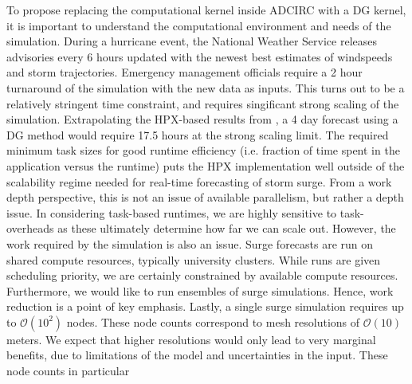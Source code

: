 To propose replacing the computational kernel inside ADCIRC with a DG kernel, it is important to understand the computational environment and needs of the simulation. During a hurricane event, the National Weather Service releases advisories every 6 hours updated with the newest best estimates of windspeeds and storm trajectories. Emergency management officials require a 2 hour turnaround of the simulation with the new data as inputs. This turns out to be a relatively stringent time constraint, and requires singificant strong scaling of the simulation. Extrapolating the HPX-based results from \cite{Bremer2019}, a 4 day forecast using a DG method would require 17.5 hours at the strong scaling limit.  The required minimum task sizes for good runtime efficiency (i.e. fraction of time spent in the application versus the runtime) puts the HPX implementation well outside of the scalability regime needed for real-time forecasting of storm surge. 
From a work depth perspective, this is not an issue of available parallelism, but rather a depth issue. In considering task-based runtimes, we are highly sensitive to task-overheads as these ultimately determine how far we can scale out.
 However, the work required by the simulation is also an issue. Surge forecasts are run on shared compute resources, typically university clusters. While runs are given scheduling priority, we are certainly constrained by available compute resources. Furthermore, we would like to run ensembles of surge simulations. Hence, work reduction is a point of key emphasis.
 Lastly, a single surge simulation requires up to $\mathcal{O}(10^2)$ nodes. These node counts correspond to mesh resolutions of $\mathcal{O}(10)$ meters. We expect that higher resolutions would only lead to very marginal benefits, due to limitations of the model and uncertainties in the input. These node counts in particular 


